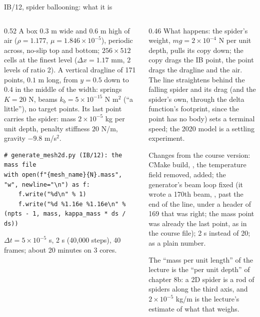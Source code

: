 \documentclass[aspectratio=169,11pt]{beamer}
\begin{document}
\begin{frame}[fragile]{IB/12, spider ballooning: what it is}
\label{fr:ib12}
\begin{columns}[T,onlytextwidth]
\begin{column}{0.52\textwidth}
\scriptsize A box $0.3$ m wide and $0.6$ m high of air ($\rho = 1.177$, $\mu = 1.846\times10^{-5}$), periodic across, no-slip top and bottom; $256\times512$ cells at the finest level ($\Delta x = 1.17$ mm, 2 levels of ratio 2). A vertical dragline of 171 points, $0.1$ m long, from $y = 0.5$ down to $0.4$ in the middle of the width: springs $K = 20$ N, beams $k_b = 5\times10^{-15}$ N m$^2$ (``a little''), no target points. Its last point carries the spider: mass $2\times10^{-5}$ kg per unit depth, penalty stiffness $20$ N/m, gravity $-9.8$ m/s$^2$.
\begin{lstlisting}[style=pythontiny]
# generate_mesh2d.py (IB/12): the mass file
with open(f"{mesh_name}{N}.mass", "w", newline="\n") as f:
    f.write("%d\n" % 1)
    f.write("%d %1.16e %1.16e\n" % (npts - 1, mass, kappa_mass * ds / ds))
\end{lstlisting}
\footnotesize $\Delta t = 5\times10^{-5}$ s, 2 s (40,000 steps), 40 frames; about 20 minutes on 3 cores.
\end{column}
\begin{column}{0.46\textwidth}
\scriptsize What happens: the spider's weight, $m g = 2\times10^{-4}$ N per unit depth, pulls its copy down; the copy drags the IB point, the point drags the dragline and the air. The line straightens behind the falling spider and its drag (and the spider's own, through the delta function's footprint, since the point has no body) sets a terminal speed; the 2020 model is a settling experiment.
\vspace{1mm}

\footnotesize Changes from the course version: CMake build, , the temperature field removed,  added; the generator's beam loop fixed (it wrote a 170th beam, , past the end of the line, under a header of 169 that was right; the mass point was already the last point, as in the course file); 2 s instead of 20;  as a plain number.
\vspace{1mm}

\footnotesize The ``mass per unit length'' of the lecture is the ``per unit depth'' of chapter 8b: a 2D spider is a rod of spiders along the third axis, and $2\times10^{-5}$ kg/m is the lecture's estimate of what that weighs.
\end{column}
\end{columns}
\end{frame}
\end{document}
